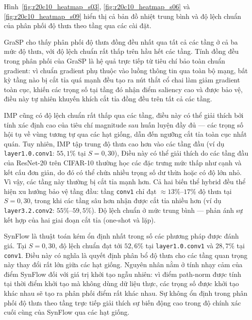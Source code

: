 Hình~\ref{fig:r20c10_heatmap_s03}, \ref{fig:r20c10_heatmap_s06} và
\ref{fig:r20c10_heatmap_s09} hiển thị cả bản đồ nhiệt trung bình và
độ lệch chuẩn của phân phối độ thưa theo tầng qua các cài đặt.
 
GraSP cho thấy phân phối độ thưa đồng đều nhất qua tất cả các tầng ở cả ba mức độ thưa,
với độ lệch chuẩn rất thấp trên hầu hết các tầng.
Tính đồng đều trong phân phối của GraSP là hệ quả trực tiếp từ tiêu chí bảo toàn chuẩn gradient: vì chuẩn gradient
phụ thuộc vào luồng thông tin qua toàn bộ mạng, bất kỳ tầng nào bị cắt tỉa quá mạnh đều tạo ra
nút thắt cổ chai làm giảm gradient toàn cục, khiến các trọng số tại tầng đó nhận điểm saliency
cao và được bảo vệ, điều này tự nhiên khuyến khích cắt tỉa đồng đều trên tất cả các tầng.
 
IMP cũng có độ lệch chuẩn rất thấp qua các tầng, điều này có thể giải thích bởi tính xác định
cao của tiêu chí magnitude sau huấn luyện đầy đủ — các trọng số hội tụ về vùng tương tự qua
các hạt giống, dẫn đến ngưỡng cắt tỉa toàn cục nhất quán. %
Tuy nhiên, IMP tập trung độ thưa cao hơn vào các tầng đầu (ví dụ
\texttt{layer1.0.conv1}: $55{,}1\%$ tại $S=0{,}30$), Điều này có thể giải thích do
các tầng đầu của ResNet-20 trên CIFAR-10 thường học các đặc trưng mức thấp như cạnh
và kết cấu đơn giản, do đó có thể chứa nhiều trọng số dư thừa hoặc có độ lớn nhỏ. Vì
vậy, các tầng này thường bị cắt tỉa mạnh hơn.
Cả hai biến thể hybrid đều thể hiện xu hướng bảo vệ tầng đầu: tầng \texttt{conv1}
chỉ đạt $\approx13\%$--$17\%$ độ thưa tại $S=0{,}30$, trong khi các tầng sâu hơn nhận
được cắt tỉa nhiều hơn (ví dụ \texttt{layer3.2.conv2}: $55\%$--$59{,}5\%$).
Độ lệch chuẩn ở mức trung bình --- 
phản ánh sự kết hợp của hai giai đoạn cắt tỉa (one-shot và lặp). 

SynFlow là thuật toán kém ổn định nhất trong số các phương pháp được đánh giá.
Tại $S=0{,}30$, độ lệch chuẩn đạt tới $52{,}6\%$ tại \texttt{layer1.0.conv1} và $28{,}7\%$
tại \texttt{conv1}. Điều này có nghĩa là quyết định phân bổ độ thưa cho các tầng quan
trọng này thay đổi rất lớn giữa các hạt giống.
Nguyên nhân nằm ở tính nhạy cảm của điểm SynFlow đối với giá trị khởi tạo ngẫu nhiên:
vì điểm path-norm được tính tại thời điểm khởi tạo mà không dùng dữ liệu thực, các trọng %
số được khởi tạo khác nhau sẽ tạo ra phân phối điểm rất khác nhau.
Sự không ổn định trong phân phối độ thưa theo tầng trực tiếp giải thích sự biến động cao
trong độ chính xác cuối cùng của SynFlow qua các hạt giống.
 
